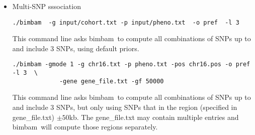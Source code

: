 \documentclass[11pt,Palatino]{article}
\def\bimbam{{\sc bimbam}~}
\begin{document}
\begin{itemize}
\begin{itemize}
\item Binary phenotypes
\begin{verbatim}
./bimbam -gmode 1 -g case_mgt.txt -p 1 -g ctrl_mgt.txt -p z -pos pos.txt\
                  -o pref  -A 0.2 -D 0.05 -cc  
\end{verbatim}
This command line asks \bimbam to compute Bayes factors with Laplace approximation. The '-p 1' assign all individuals in the matching genotype (case\_mgt.txt in the example) as 1, and '-p z' assign all individuals in the matching genotype (ctrl\_mgt.txt in the example) as 0. Recall '-p 0' denotes the matching genotypes are panel.    

\item Compute p-values.
\begin{verbatim}
./bimbam -gmode 1 -g input/mgt.txt -p input/pheno.txt -o pref -pval 100000
\end{verbatim}
This command line asks \bimbam to compute single SNP Bayes factors, and compute p-values for each SNP via permuation phenotypes $100000$ times.  


\item Importance sampling
\begin{verbatim}
./bimbam -g panel.txt -p 0 -g cohort.txt -p pheno.txt  -pos pos.txt 
           -e 10 -w 20 -s 1 -c 15  -o pref -wgd -i 10000
./bimbam -gmode 2 -g input/gdens.txt -p input/pheno.txt -i 10000 -o pref
\end{verbatim}
This first command line asks \bimbam impute, output genotype distribution, and compute single-SNP BFs by sampling genotypes $10000$ times.  Note if use '-i 1' then \bimbam use mean genotypes to compute Bayes factor without sampling. The second command line read in a genotype distribution file and do importance sampling. 
\end{itemize}

\item {\sc Multi-SNP sssociation}
\begin{verbatim}
./bimbam  -g input/cohort.txt -p input/pheno.txt  -o pref  -l 3   
\end{verbatim}
This command line asks \bimbam to compute all combinations of SNPs up to and include $3$ SNPs,  using default priors.

\begin{verbatim}
./bimbam -gmode 1 -g chr16.txt -p pheno.txt -pos chr16.pos -o pref  -l 3  \
             -gene gene_file.txt -gf 50000   
\end{verbatim}
This command line asks \bimbam to compute all combinations of SNPs up to and include $3$ SNPs,   but only using SNPs that in the region (specified in gene\_file.txt) $\pm 50$kb.  The gene\_file.txt may contain multiple entries and \bimbam will compute those regions separately.


\end{itemize}
\end{document}
